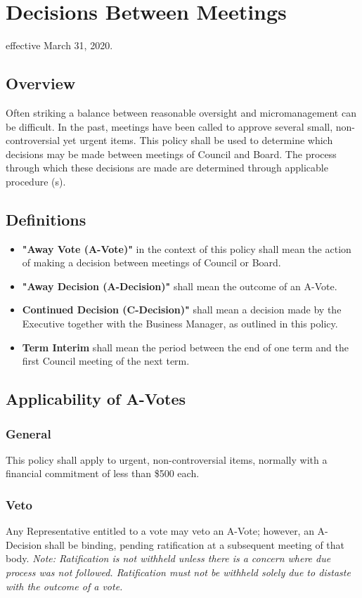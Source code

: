\section{Decisions Between Meetings}
effective March 31, 2020.

\subsection{Overview}
Often striking a balance between reasonable oversight and micromanagement can be difficult.  In
the past, meetings have been called to approve several small, non-controversial yet 
urgent items.  This policy shall be used to determine which decisions may be made between 
meetings of Council and Board.  The process through which these decisions are made are determined through applicable procedure (s).

\subsection{Definitions}
\begin{itemize}
    \item \textbf{"Away Vote (A-Vote)"} in the context of this policy shall mean the action of making a decision between meetings of Council or Board. 
    \item \textbf{"Away Decision (A-Decision)"} shall mean the outcome of an A-Vote.
    \item \textbf{Continued Decision (C-Decision)"} shall mean a decision made by the Executive together with the Business Manager, as outlined in this policy. 
    \item \textbf{Term Interim} shall mean the period between the end of one term and the first Council meeting of the next term.
\end{itemize}

\subsection{Applicability of A-Votes}

\subsubsection{General}
This policy shall apply to urgent, non-controversial items, normally with a financial commitment 
of less than \$500 each.

\subsubsection{Veto}
Any Representative entitled to a vote may veto an A-Vote; however, an A-Decision shall be binding, 
pending ratification at a subsequent meeting of that body.
\textit{Note: Ratification is not withheld unless there is a concern where due process was not 
followed. Ratification must not be withheld solely due to distaste with the outcome of a vote.}

